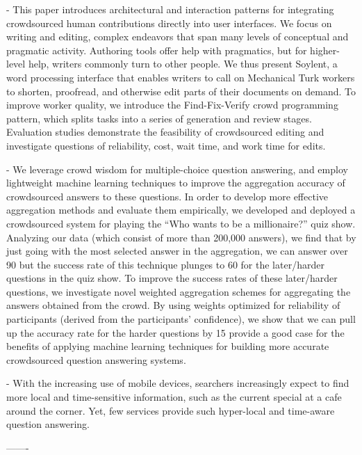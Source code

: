 \documentclass[11pt,letterpaper]{article}
\begin{document}
\cite{bernstein2015soylent} - This paper introduces architectural and interaction patterns for integrating crowdsourced human contributions directly into user interfaces. We focus on writing and editing, complex endeavors that span many levels of conceptual and pragmatic activity. Authoring tools offer help with pragmatics, but for higher-level help, writers commonly turn to other people. We thus present Soylent, a word processing interface that enables writers to call on Mechanical Turk workers to shorten, proofread, and otherwise edit parts of their documents on demand. To improve worker quality, we introduce the Find-Fix-Verify crowd programming pattern, which splits tasks into a series of generation and review stages. Evaluation studies demonstrate the feasibility of crowdsourced editing and investigate questions of reliability, cost, wait time, and work time for edits.

\cite{aydin2014crowdsourcing} - We leverage crowd wisdom for multiple-choice question
answering, and employ lightweight machine learning
techniques to improve the aggregation accuracy of
crowdsourced answers to these questions. In order to
develop more effective aggregation methods and evaluate
them empirically, we developed and deployed a
crowdsourced system for playing the “Who wants to be
a millionaire?” quiz show. Analyzing our data (which
consist of more than 200,000 answers), we find that by
just going with the most selected answer in the aggregation,
we can answer over 90%
but the success rate of this technique plunges to 60%
for the later/harder questions in the quiz show. To improve
the success rates of these later/harder questions,
we investigate novel weighted aggregation schemes for
aggregating the answers obtained from the crowd. By
using weights optimized for reliability of participants
(derived from the participants’ confidence), we show that
we can pull up the accuracy rate for the harder questions
by 15%
provide a good case for the benefits of applying
machine learning techniques for building more accurate
crowdsourced question answering systems.

\cite{liu2015real} - With the increasing
use of mobile devices, searchers increasingly expect to find
more local and time-sensitive information, such as the current
special at a cafe around the corner. Yet, few services provide
such hyper-local and time-aware question answering.

-------
\end{document}
